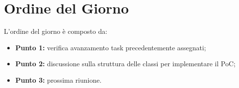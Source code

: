 \section{Ordine del Giorno}
L'ordine del giorno è composto da: 
\begin{itemize}
	\item \textbf{Punto 1:} verifica avanzamento task precedentemente assegnati;
	\item \textbf{Punto 2:} discussione sulla struttura delle classi per implementare il PoC\glossario;
	\item \textbf{Punto 3:} prossima riunione.
\end{itemize}
